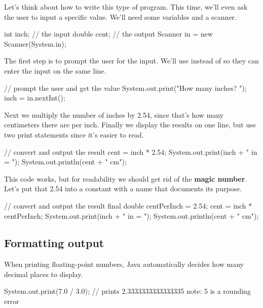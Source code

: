 Let's think about how to write this type of program.
This time, we'll even ask the user to input a specific value.
We'll need some variables and a scanner.

\begin{code}
    int inch;  // the input
    double cent;  // the output
    Scanner in = new Scanner(System.in);
\end{code}

The first step is to prompt the user for the input.
We'll use  instead of  so they can enter the input on the same line.

\begin{code}
    // prompt the user and get the value
    System.out.print("How many inches? ");
    inch = in.nextInt();
\end{code}

Next we multiply the number of inches by 2.54, since that's how many centimeters there are per inch.
Finally we display the results on one line, but use two print statements since it's easier to read.

\begin{code}
    // convert and output the result
    cent = inch * 2.54;
    System.out.print(inch + " in = ");
    System.out.println(cent + " cm");
\end{code}


This code works, but for readability we should get rid of the {\bf magic number}.
Let's put that 2.54 into a constant with a name that documents its purpose.

\begin{code}
    // convert and output the result
    final double centPerInch = 2.54;
    cent = inch * centPerInch;
    System.out.print(inch + " in = ");
    System.out.println(cent + " cm");
\end{code}

\subsection{Formatting output}

When printing floating-point numbers, Java automatically decides how many decimal places to display.

\begin{code}
    System.out.print(7.0 / 3.0);
    // prints 2.3333333333333335   note: 5 is a rounding error
\end{code}

